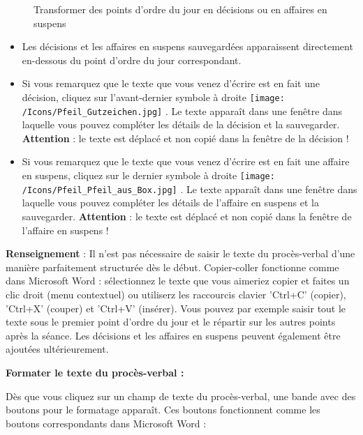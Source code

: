 \begin{figure}[H]
\caption{Transformer des points d'ordre du jour en décisions ou en affaires en suspens}
\end{figure}

\begin{itemize}
\item
Les décisions et les affaires en suspens sauvegardées apparaissent directement en-dessous du point d'ordre du jour correspondant.
\item
Si vous remarquez que le texte que vous venez d'écrire est en fait une décision, cliquez sur l'avant-dernier symbole à droite \texttt{[image: /Icons/Pfeil\_Gutzeichen.jpg]} . Le texte apparaît dans une fenêtre dans laquelle vous pouvez compléter les détails de la décision et la sauvegarder. \textbf{Attention} : le texte est déplacé et non copié dans la fenêtre de la décision !
\item
Si vous remarquez que le texte que vous venez d'écrire est en fait une affaire en suspens, cliquez sur le dernier symbole à droite \texttt{[image: /Icons/Pfeil\_Pfeil\_aus\_Box.jpg]} . Le texte apparaît dans une fenêtre dans laquelle vous pouvez compléter les détails de l'affaire en suspens et la sauvegarder. \textbf{Attention} : le texte est déplacé et non copié dans la fenêtre de l'affaire en suspens !
\end{itemize}


\textbf{Renseignement} : Il n'est pas nécessaire de saisir le texte du procès-verbal d'une manière parfaitement structurée dès le début. Copier-coller fonctionne comme dans Microsoft Word : sélectionnez le texte que vous aimeriez copier et faites un clic droit (menu contextuel) ou utiliserz les raccourcis clavier 'Ctrl+C' (copier), 'Ctrl+X' (couper) et 'Ctrl+V' (insérer). Vous pouvez par exemple saisir tout le texte sous le premier point d'ordre du jour et le répartir sur les autres points après la séance. Les décisions et les affaires en suspens peuvent également être ajoutées ultérieurement.

\vspace{\baselineskip}

\textbf{Formater le texte du procès-verbal :}


Dès que vous cliquez sur un champ de texte du procès-verbal, une bande avec des boutons pour le formatage  apparaît. Ces boutons fonctionnent comme les boutons correspondants dans Microsoft Word :

